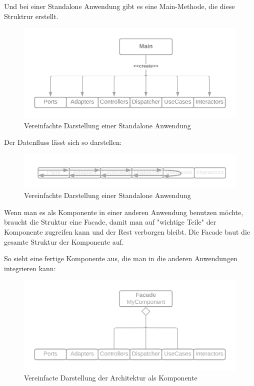 \documentclass{article}
\begin{document}
    Und bei einer Standalone Anwendung gibt es eine Main-Methode, die diese Struktrur erstellt.
    \begin{figure}[H]
        \centering
        \includegraphics[width=1\textwidth]{./images/Architecture as Standalone.png}
        \caption{Vereinfachte Darstellung einer Standalone Anwendung}
        \label{fig:SimpliedArchitectureAsStandalone}
    \end{figure}
    
    Der Datenfluss lässt sich so darstellen:
    \begin{figure}[H]
        \centering
        \includegraphics[width=1\textwidth]{./images/Dataflow.png}
        \caption{Vereinfachte Darstellung einer Standalone Anwendung}
        \label{fig:SimpliedArchitectureDataflow}
    \end{figure}

    \newpage
    Wenn man es als Komponente in einer anderen Anwendung benutzen möchte, braucht die Struktur eine Facade, damit man 
    auf "wichtige Teile" der Komponente zugreifen kann und der Rest verborgen bleibt. 
    Die Facade baut die gesamte Struktur der Komponente auf.

    So sieht eine fertige Komponente aus, die man in die anderen Anwendungen integrieren kann:
    \begin{figure}[H]
        \centering
        \includegraphics[width=1\textwidth]{./images/Architecture as Facade.png}
        \caption{Vereinfacte Darstellung der Architektur als Komponente}
        \label{fig:SimpliedArchitectureAsKomponent}
    \end{figure}
\end{document}
